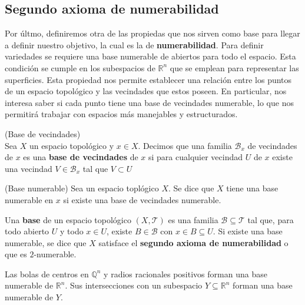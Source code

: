 \subsection{Segundo axioma de numerabilidad}
Por últmo, definiremos otra de las propiedas que nos sirven como base para llegar a definir nuestro objetivo, la cual es la de \textbf{numerabilidad}. 
Para definir variedades se requiere una base numerable de abiertos para todo el espacio. Esta condición se cumple en los subespacios de $\mathbb{R}^n$ que se emplean para representar las superficies.
Esta propiedad nos permite establecer una relación entre los puntos de un espacio topológico y las vecindades que estos poseen. En particular, nos interesa saber si cada punto tiene una base de vecindades numerable, lo que nos permitirá trabajar con espacios más manejables y estructurados.

\begin{definition}(Base de vecindades)
\label{def:base-vecindades}
    \\Sea $X$ un espacio topológico y $x \in X$. Decimos que una familia $\mathcal{B}_x$ de vecindades de $x$ es una \textbf{base de vecindades} de $x$ si para cualquier vecindad $U$ de $x$ existe una vecindad $V \in  \mathcal{B}_x$ tal que $V \subset U$
\end{definition}

\begin{definition}(Base numerable)
\label{def:base-numerable-local}
    Sea un espacio toplógico $X$. Se dice que $X$ tiene una base numerable en $x$ si existe una base de vecindades numerable.

\end{definition}

\begin{definition}
\label{def:segundo-axioma-numerabilidad}
Una \textbf{base} de un espacio topológico $(X,\mathcal{T})$ es una familia $\mathcal{B}\subseteq\mathcal{T}$ tal que, para todo abierto $U$ y todo $x\in U$, existe $B\in\mathcal{B}$ con $x\in B\subseteq U$. Si existe una base numerable, se dice que $X$ satisface el \textbf{segundo axioma de numerabilidad} o que es $2$-numerable.
\end{definition}

\begin{example}
Las bolas de centros en $\mathbb{Q}^n$ y radios racionales positivos forman una base numerable de $\mathbb{R}^n$. Sus intersecciones con un subespacio $Y\subseteq\mathbb{R}^n$ forman una base numerable de $Y$.
\end{example}


